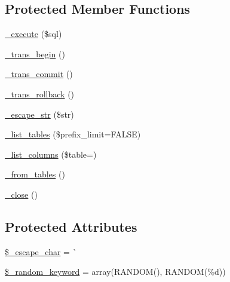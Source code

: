 \subsection*{Protected Member Functions}
\begin{DoxyCompactItemize}
\item 
\mbox{\hyperlink{class_c_i___d_b__cubrid__driver_a114ab675d89bf8324a41785fb475e86d}{\+\_\+execute}} (\$sql)
\item 
\mbox{\hyperlink{class_c_i___d_b__cubrid__driver_ac81ac882c1d54347d810199a15856aac}{\+\_\+trans\+\_\+begin}} ()
\item 
\mbox{\hyperlink{class_c_i___d_b__cubrid__driver_a6fe7f373e0b11cfae23a5f41c0b35dda}{\+\_\+trans\+\_\+commit}} ()
\item 
\mbox{\hyperlink{class_c_i___d_b__cubrid__driver_ad49a116b0776c26b53114c9093fd102a}{\+\_\+trans\+\_\+rollback}} ()
\item 
\mbox{\hyperlink{class_c_i___d_b__cubrid__driver_af8ef0237bfcdb19215b63fff769e7a55}{\+\_\+escape\+\_\+str}} (\$str)
\item 
\mbox{\hyperlink{class_c_i___d_b__cubrid__driver_a435c0f3ce54fe7daa178baa8532ebd54}{\+\_\+list\+\_\+tables}} (\$prefix\+\_\+limit=F\+A\+L\+SE)
\item 
\mbox{\hyperlink{class_c_i___d_b__cubrid__driver_a7ccb7f9c301fe7f0a9db701254142b63}{\+\_\+list\+\_\+columns}} (\$table=\textquotesingle{}\textquotesingle{})
\item 
\mbox{\hyperlink{class_c_i___d_b__cubrid__driver_aef43f7e3e7b71d337ff3724c5eb14f10}{\+\_\+from\+\_\+tables}} ()
\item 
\mbox{\hyperlink{class_c_i___d_b__cubrid__driver_a4d9082658000e5ede8312067c6dda9db}{\+\_\+close}} ()
\end{DoxyCompactItemize}
\subsection*{Protected Attributes}
\begin{DoxyCompactItemize}
\item 
\mbox{\hyperlink{class_c_i___d_b__cubrid__driver_aaec2fb0112850159063a8e47ad3aed6e}{\$\+\_\+escape\+\_\+char}} = \textquotesingle{}\`{}\textquotesingle{}
\item 
\mbox{\hyperlink{class_c_i___d_b__cubrid__driver_a10213aa6e05f6d924d3277bb1d2fea00}{\$\+\_\+random\+\_\+keyword}} = array(\textquotesingle{}R\+A\+N\+D\+OM()\textquotesingle{}, \textquotesingle{}R\+A\+N\+D\+OM(\%d)\textquotesingle{})
\end{DoxyCompactItemize}


